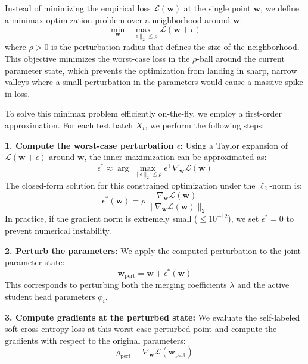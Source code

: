\documentclass{article}
\begin{document}
Instead of minimizing the empirical loss $\mathcal{L}(\mathbf{w})$ at the single point $\mathbf{w}$, we define a minimax optimization problem over a neighborhood around $\mathbf{w}$:
\begin{equation}
    \min_{\mathbf{w}} \max_{\|\epsilon\|_2 \le \rho} \mathcal{L}(\mathbf{w} + \epsilon)
\end{equation}
where $\rho > 0$ is the perturbation radius that defines the size of the neighborhood. This objective minimizes the worst-case loss in the $\rho$-ball around the current parameter state, which prevents the optimization from landing in sharp, narrow valleys where a small perturbation in the parameters would cause a massive spike in loss.

To solve this minimax problem efficiently on-the-fly, we employ a first-order approximation. For each test batch $X_i$, we perform the following steps:

\textbf{1. Compute the worst-case perturbation $\epsilon$:}
Using a Taylor expansion of $\mathcal{L}(\mathbf{w} + \epsilon)$ around $\mathbf{w}$, the inner maximization can be approximated as:
\begin{equation}
    \epsilon^* \approx \arg\max_{\|\epsilon\|_2 \le \rho} \epsilon^\top \nabla_{\mathbf{w}} \mathcal{L}(\mathbf{w})
\end{equation}
The closed-form solution for this constrained optimization under the $\ell_2$-norm is:
\begin{equation}
    \epsilon^*(\mathbf{w}) = \rho \frac{\nabla_{\mathbf{w}} \mathcal{L}(\mathbf{w})}{\|\nabla_{\mathbf{w}} \mathcal{L}(\mathbf{w})\|_2}
\end{equation}
In practice, if the gradient norm is extremely small ($\le 10^{-12}$), we set $\epsilon^* = 0$ to prevent numerical instability.

\textbf{2. Perturb the parameters:}
We apply the computed perturbation to the joint parameter state:
\begin{equation}
    \mathbf{w}_{\text{pert}} = \mathbf{w} + \epsilon^*(\mathbf{w})
\end{equation}
This corresponds to perturbing both the merging coefficients $\lambda$ and the active student head parameters $\phi_i$.

\textbf{3. Compute gradients at the perturbed state:}
We evaluate the self-labeled soft cross-entropy loss at this worst-case perturbed point and compute the gradients with respect to the original parameters:
\begin{equation}
    g_{\text{pert}} = \nabla_{\mathbf{w}} \mathcal{L}(\mathbf{w}_{\text{pert}})
\end{equation}
\end{document}
